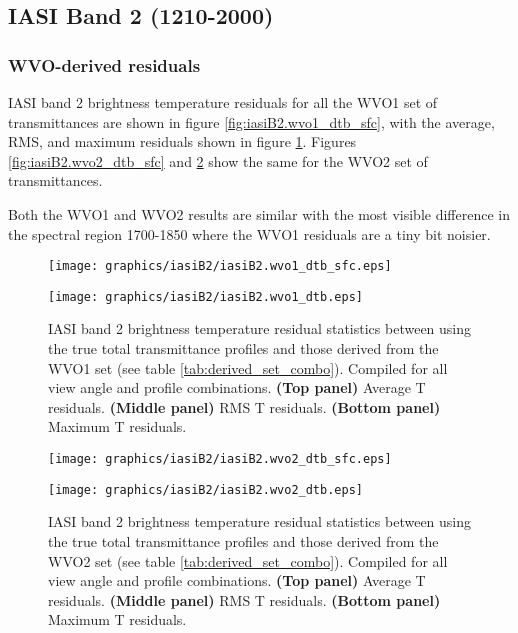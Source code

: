 \subsection{IASI Band 2 (1210-2000\invcm)}

\subsubsection{WVO-derived residuals}
IASI band 2 brightness temperature residuals for all the WVO1 set of transmittances are shown in figure \ref{fig:iasiB2.wvo1_dtb_sfc}, with the average, RMS, and maximum residuals shown in figure \ref{fig:iasiB2.wvo1_dtb}. Figures \ref{fig:iasiB2.wvo2_dtb_sfc} and \ref{fig:iasiB2.wvo2_dtb} show the same for the WVO2 set of transmittances.

Both the WVO1 and WVO2 results are similar with the most visible difference in the spectral region 1700-1850\invcm{} where the WVO1 residuals are a tiny bit noisier.
\begin{figure}[htp]
  \centering
  \texttt{[image: graphics/iasiB2/iasiB2.wvo1\_dtb\_sfc.eps]}
  \caption{IASI band 2 brightness temperature residuals for all view angles and profiles between using the true total transmittance profiles and those derived from the WVO1 set (see table \ref{tab:derived_set_combo})}
  \label{fig:iasiB2.wvo1_dtb_sfc}
  \vspace{1em}
  \texttt{[image: graphics/iasiB2/iasiB2.wvo1\_dtb.eps]}
  \caption{IASI band 2 brightness temperature residual statistics between using the true total transmittance profiles and those derived from the WVO1 set (see table \ref{tab:derived_set_combo}). Compiled for all view angle and profile combinations. \textbf{(Top panel)} Average T residuals. \textbf{(Middle panel)} RMS T residuals. \textbf{(Bottom panel)} Maximum T residuals.}
  \label{fig:iasiB2.wvo1_dtb}
\end{figure}
\begin{figure}[htp]
  \centering
  \texttt{[image: graphics/iasiB2/iasiB2.wvo2\_dtb\_sfc.eps]}
  \caption{IASI band 2 brightness temperature residuals for all view angles and profiles between using the true total transmittance profiles and those derived from the WVO2 set (see table \ref{tab:derived_set_combo})}
  \label{fig:iasiB2.wvo2_dtb_sfc}
  \vspace{1em}
  \texttt{[image: graphics/iasiB2/iasiB2.wvo2\_dtb.eps]}
  \caption{IASI band 2 brightness temperature residual statistics between using the true total transmittance profiles and those derived from the WVO2 set (see table \ref{tab:derived_set_combo}). Compiled for all view angle and profile combinations. \textbf{(Top panel)} Average T residuals. \textbf{(Middle panel)} RMS T residuals. \textbf{(Bottom panel)} Maximum T residuals.}
  \label{fig:iasiB2.wvo2_dtb}
\end{figure}


